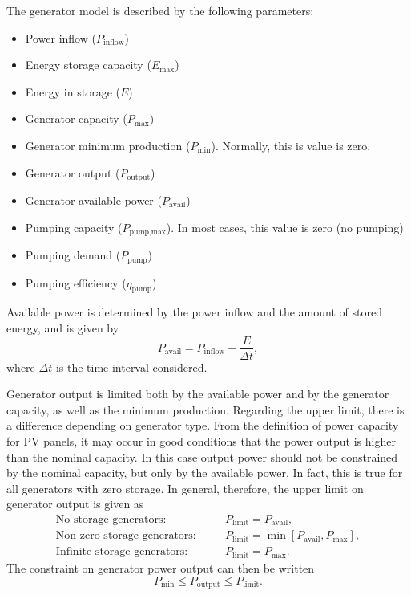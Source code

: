 \documentclass{article}
\begin{document}
The generator model is described by the following parameters:
\begin{itemize}
\item Power inflow ($P_\text{inflow}$)
\item Energy storage capacity ($E_\text{max}$)
\item Energy in storage ($E$)
\item Generator capacity ($P_\text{max}$)
\item Generator minimum production ($P_\text{min}$). Normally, this is value is zero.
\item Generator output ($P_\text{output}$)
\item Generator available power ($P_\text{avail}$)
\item Pumping capacity ($P_\text{pump,max}$). In most cases, this value is zero (no pumping)
\item Pumping demand ($P_\text{pump}$)
\item Pumping efficiency ($\eta_\text{pump}$)
\end{itemize}

Available power is determined by the power inflow and the amount of stored energy, and is given by
\begin{equation}
	 P_\text{avail} = P_\text{inflow} + \frac{E}{\Delta t},
\end{equation}
where $\Delta t$ is the time interval considered.

Generator output is limited both by the available power and by the generator capacity, as well as the minimum production. Regarding the upper limit, there is a difference depending on generator type.
%
From the definition of power capacity for PV panels, it may occur in good conditions that the power output is higher than the nominal capacity. In this case output power should not be constrained by the nominal capacity, but only by the available power.  In fact, this is true for all generators with zero storage. 
In general, therefore, the upper limit on generator output is given as
\begin{eqnarray}
	\text{No storage generators:} \quad && P_\text{limit} = P_\text{avail},
	\\
	\text{Non-zero storage generators:} \quad && P_\text{limit} = \min[P_\text{avail}, P_\text{max}],
	\\
	\text{Infinite storage generators:} \quad && P_\text{limit} = P_\text{max}.
\end{eqnarray}
The constraint on generator power output can then be written
\begin{equation}
	 P_\text{min} \le P_\text{output} \le P_\text{limit}.
\end{equation}
\end{document}
